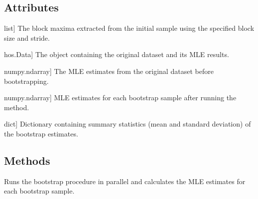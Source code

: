 \documentclass[a4paper,11pt,openany,english]{sphinxmanual}
\begin{document}
\begin{fulllineitems}
\begin{description}
\end{description}


\subsection{Attributes}
\label{\detokenize{api_bootstrap:attributes}}\begin{description}
\sphinxlineitem{circmaxs}{[}list{]}
\sphinxAtStartPar
The block maxima extracted from the initial sample using the specified block size and stride.

\sphinxlineitem{data}{[}hos.Data{]}
\sphinxAtStartPar
The  object containing the original dataset and its MLE results.

\sphinxlineitem{MLEvals}{[}numpy.ndarray{]}
\sphinxAtStartPar
The MLE estimates from the original dataset before bootstrapping.

\sphinxlineitem{values}{[}numpy.ndarray{]}
\sphinxAtStartPar
MLE estimates for each bootstrap sample after running the  method.

\sphinxlineitem{statistics}{[}dict{]}
\sphinxAtStartPar
Dictionary containing summary statistics (mean and standard deviation) of the bootstrap estimates.

\end{description}


\subsection{Methods}
\label{\detokenize{api_bootstrap:methods}}\begin{description}
\sphinxAtStartPar
Runs the bootstrap procedure in parallel and calculates the MLE estimates for each bootstrap sample.

\end{description}



\end{fulllineitems}
\end{document}
